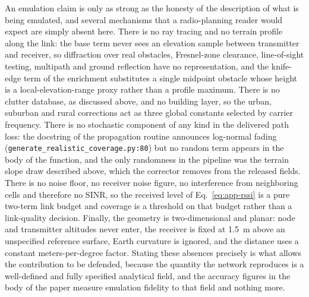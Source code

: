 An emulation claim is only as strong as the honesty of the description of
what is being emulated, and several mechanisms that a radio-planning reader
would expect are simply absent here. There is no ray tracing and no terrain
profile along the link: the base term never sees an elevation sample
between transmitter and receiver, so diffraction over real obstacles,
Fresnel-zone clearance, line-of-sight testing, multipath and ground
reflection have no representation, and the knife-edge term of the
enrichment substitutes a single midpoint obstacle whose height is a
local-elevation-range proxy rather than a profile maximum. There is no clutter
database, as discussed above, and no building layer, so the urban,
suburban and rural corrections act as three global constants selected by
carrier frequency. There is no stochastic component of any kind in the
delivered path loss: the docstring of the propagation routine announces
log-normal fading (\texttt{generate\_\allowbreak{}realistic\_\allowbreak{}coverage\allowbreak{}.py:\allowbreak{}80}) but no
random term appears in the body of the function, and the only randomness in
the pipeline was the terrain slope draw described above, which the corrector
removes from the released fields. There is no noise floor, no
receiver noise figure, no interference from neighboring cells and
therefore no SINR, so the received level of Eq.~\eqref{eq:app-rssi} is a
pure two-term link budget and coverage is a threshold on that budget rather
than a link-quality decision. Finally, the geometry is two-dimensional and
planar: node and transmitter altitudes never enter, the receiver is fixed
at 1.5~m above an unspecified reference surface, Earth curvature is
ignored, and the distance uses a constant meters-per-degree factor. Stating
these absences precisely is what allows the contribution to be
defended, because the quantity the network reproduces is a well-defined and
fully specified analytical field, and the accuracy figures in the body of
the paper measure emulation fidelity to that field and nothing more.
